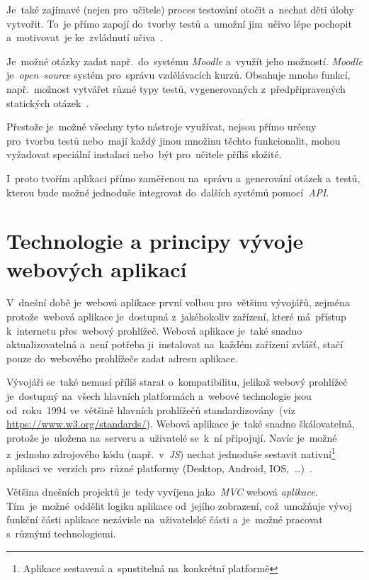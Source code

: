 \documentclass[11pt,a4paper]{report}
\let\oldacrshort\acrshort
\renewcommand{\acrshort}[1]{\emph{\normalsize\color[rgb]{0,0,0}\noindent\oldacrshort{#1}}}
\begin{document}
            Je~také zajímavé (nejen pro~učitele) proces testování otočit a~nechat děti úlohy vytvořit. To~je přímo zapojí do~tvorby testů a~umožní jim~učivo lépe pochopit a~motivovat~je ke~zvládnutí učiva~\cite{hedlovam:chybavresenim}.

            Je~možné otázky zadat např.~do~systému \emph{Moodle} a~využít jeho možností. \emph{Moodle} je~\emph{open--source} systém pro~správu vzdělávacích kurzů. Obsahuje mnoho funkcí, např.~možnost vytvářet různé typy testů, vygenerovaných z~předpřipravených statických otázek~\cite{drlik2013moodle}.

            Přestože je~možné všechny tyto nástroje využívat, nejsou přímo určeny pro~tvorbu testů nebo~mají každý jinou množinu těchto funkcionalit, mohou vyžadovat speciální instalaci nebo~být pro~učitele příliš složité.
            
            I~proto tvořím aplikaci přímo zaměřenou na~správu a~generování otázek a~testů, kterou bude možné jednoduše integrovat do~dalších systémů pomocí~\acrshort{API}.

    \chapter{Technologie a principy vývoje webových aplikací}
        V~dnešní době je~webová aplikace první volbou pro~většinu vývojářů, zejména protože~webová aplikace je~dostupná z~jakéhokoliv zařízení, které má~přístup k~internetu přes~webový prohlížeč. Webová aplikace je~také snadno aktualizovatelná a~není potřeba ji~instalovat na~každém zařízení zvlášť, stačí pouze do~webového prohlížeče zadat adresu aplikace.
        
        Vývojáři se~také nemusí příliš starat o~kompatibilitu, jelikož webový prohlížeč je~dostupný na~všech hlavních platformách a~webové technologie jsou od~roku~1994 ve~většině hlavních prohlížečů standardizovány~(viz \url{https://www.w3.org/standards/}). Webová aplikace je~také snadno škálovatelná, protože je~uložena na~serveru a~uživatelé se~k~ní připojují. Navíc je~možné z~jednoho zdrojového kódu (např.~v~\acrshort{JS}) nechat jednoduše sestavit nativní\footnote{Aplikace sestavená a~spustitelná na~konkrétní platformě} aplikaci ve~verzích pro~různé platformy (Desktop, Android, IOS,~\dots)~\cite{adobe:webapp}.

        Většina dnešních projektů je~tedy vyvíjena jako~\emph{MVC} webová \emph{aplikace}. Tím~je~možné~oddělit logiku aplikace od~jejího zobrazení, což~umožňuje vývoj funkční části aplikace nezávisle na~uživatelské části a~je~možné pracovat s~různými technologiemi.
        
\end{document}
